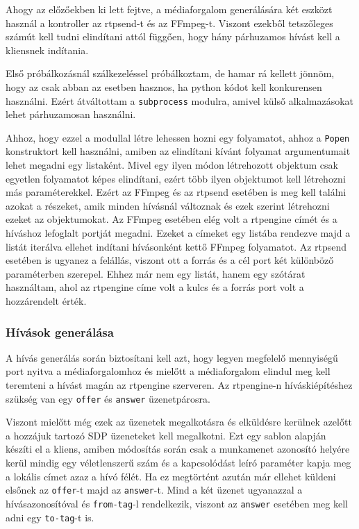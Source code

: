 Ahogy az előzőekben ki lett fejtve, a médiaforgalom generálására két eszközt 
használ a kontroller az rtpsend-t és az FFmpeg-t. Viszont ezekből tetszőleges
számút kell tudni elindítani attól függően, hogy hány párhuzamos hívást kell 
a kliensnek indítania.

Első próbálkozásnál szálkezeléssel próbálkoztam, de hamar rá kellett jönnöm,
hogy az csak abban az esetben hasznos, ha python kódot kell konkurensen 
használni. Ezért átváltottam a \texttt{subprocess} \cite{subprocess} modulra, amivel külső alkalmazásokat lehet párhuzamosan használni.

Ahhoz, hogy ezzel a modullal létre lehessen hozni egy folyamatot, ahhoz a \texttt{Popen}
konstruktort kell használni, amiben az elindítani kívánt folyamat argumentumait lehet
megadni egy listaként. Mivel egy ilyen módon létrehozott objektum csak egyetlen 
folyamatot képes elindítani, ezért több ilyen objektumot kell létrehozni más 
paraméterekkel. Ezért az FFmpeg és az rtpsend esetében is meg kell találni azokat a 
részeket, amik minden hívásnál változnak és ezek szerint létrehozni ezeket az 
objektumokat. Az FFmpeg esetében elég volt a rtpengine címét és a híváshoz lefoglalt 
portját megadni. Ezeket a címeket egy listába rendezve majd a listát iterálva ellehet 
indítani hívásonként kettő FFmpeg folyamatot. Az rtpsend esetében is ugyanez a felállás, 
viszont ott a forrás és a cél port két különböző paraméterben szerepel. Ehhez már nem egy 
listát, hanem egy szótárat használtam, ahol az rtpengine címe volt a kulcs és a forrás 
port volt a hozzárendelt érték.

\subsubsection{Hívások generálása}

A hívás generálás során biztosítani kell azt, hogy legyen megfelelő mennyiségű port
nyitva a médiaforgalomhoz és mielőtt a médiaforgalom elindul meg kell teremteni a hívást
magán az rtpengine szerveren. Az rtpengine-n híváskiépítéshez szükség van egy 
\texttt{offer} és \texttt{answer} üzenetpárosra.

Viszont mielőtt még ezek az üzenetek megalkotásra és elküldésre kerülnek azelőtt
a hozzájuk tartozó SDP üzeneteket kell megalkotni. Ezt egy sablon alapján készíti el 
a kliens, amiben módosítás során csak a munkamenet azonosító helyére kerül
mindig egy véletlenszerű szám és a kapcsolódást leíró paraméter kapja meg a lokális 
címet azaz a hívó félét. Ha ez megtörtént azután már ellehet küldeni elsőnek az 
\texttt{offer}-t majd az \texttt{answer}-t. Mind a két üzenet ugyanazzal a 
hívásazonosítóval és \texttt{from-tag}-l rendelkezik, viszont az \texttt{answer} 
esetében meg kell adni egy \texttt{to-tag}-t is.

